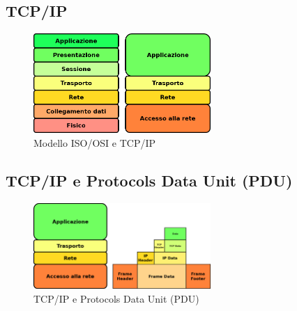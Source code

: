 \documentclass{beamer}
\begin{document}
\subsection{TCP/IP}
\begin{frame}{\insertsection}{\insertsubsection}
\begin{figure}
\includegraphics[width=0.60\textwidth]{imgs/03-iso-osi-tcp-ip.drawio.png}
\caption{Modello ISO/OSI e TCP/IP}
\end{figure}
\end{frame}


\subsection*{TCP/IP e Protocols Data Unit (PDU)}
\begin{frame}{\insertsection}{\insertsubsection}
\begin{figure}
\includegraphics[width=0.60\textwidth]{imgs/04-tcp-pdu.drawio.png}
\caption{TCP/IP e Protocols Data Unit (PDU)}
\end{figure}
\end{frame}
\end{document}
